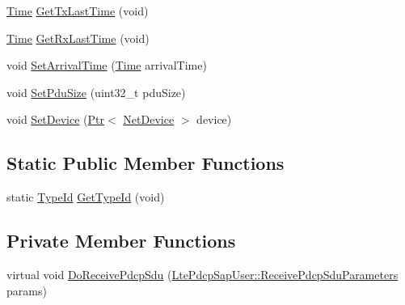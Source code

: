 \begin{DoxyCompactItemize}
\item 
\hyperlink{classns3_1_1Time}{Time} \hyperlink{classns3_1_1LteTestRrc_a555449ca2c3e4a4a4867f796b5cad4ce}{Get\+Tx\+Last\+Time} (void)
\item 
\hyperlink{classns3_1_1Time}{Time} \hyperlink{classns3_1_1LteTestRrc_a176aabdb405fefebfc9f6283d53bfea0}{Get\+Rx\+Last\+Time} (void)
\item 
void \hyperlink{classns3_1_1LteTestRrc_a6838ea264d2d1988264e35343ca84b01}{Set\+Arrival\+Time} (\hyperlink{classns3_1_1Time}{Time} arrival\+Time)
\item 
void \hyperlink{classns3_1_1LteTestRrc_a85dc25a10b975d0bccc86e5f3d3c0a8a}{Set\+Pdu\+Size} (uint32\+\_\+t pdu\+Size)
\item 
void \hyperlink{classns3_1_1LteTestRrc_a265f6c937a90f78a62ab26870684ec6f}{Set\+Device} (\hyperlink{classns3_1_1Ptr}{Ptr}$<$ \hyperlink{classns3_1_1NetDevice}{Net\+Device} $>$ device)
\end{DoxyCompactItemize}
\subsection*{Static Public Member Functions}
\begin{DoxyCompactItemize}
\item 
static \hyperlink{classns3_1_1TypeId}{Type\+Id} \hyperlink{classns3_1_1LteTestRrc_a0119c390107898723d51715866fb76a0}{Get\+Type\+Id} (void)
\end{DoxyCompactItemize}
\subsection*{Private Member Functions}
\begin{DoxyCompactItemize}
\item 
virtual void \hyperlink{classns3_1_1LteTestRrc_a9b019b8400df7b5dc029f23a21133213}{Do\+Receive\+Pdcp\+Sdu} (\hyperlink{structns3_1_1LtePdcpSapUser_1_1ReceivePdcpSduParameters}{Lte\+Pdcp\+Sap\+User\+::\+Receive\+Pdcp\+Sdu\+Parameters} params)
\end{DoxyCompactItemize}
